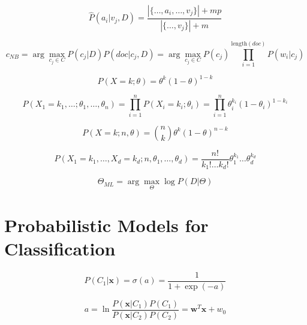 \documentclass{article}
\begin{document}
\begin{equation}
    \hat{P}(a_i | v_j, D) = \frac{|\{ \ldots, a_i, \ldots, v_j \}| + m p}{|\{ \ldots, v_j \}| + m}
\end{equation}

\begin{equation}
    c_{NB} = \arg\max_{c_j \in C} P(c_j | D) P(doc | c_j, D) = \arg\max_{c_j \in C} P(c_j) \prod_{i=1}^{\text{length}(doc)} P(w_i | c_j)
\end{equation}

\begin{equation}
    P(X = k; \theta) = \theta^k (1 - \theta)^{1 - k}
\end{equation}

\begin{equation}
    P(X_1 = k_1, \ldots ; \theta_1, \ldots, \theta_n) = \prod_{i=1}^n P(X_i = k_i; \theta_i) = \prod_{i=1}^n \theta_i^{k_i} (1 - \theta_i)^{1 - k_i}
\end{equation}

\begin{equation}
    P(X = k; n, \theta) = \binom{n}{k} \theta^k (1 - \theta)^{n - k}
\end{equation}

\begin{equation}
    P(X_1 = k_1, \ldots, X_d = k_d; n, \theta_1, \ldots, \theta_d) = \frac{n!}{k_1! \ldots k_d!} \theta_1^{k_1} \ldots \theta_d^{k_d}
\end{equation}

\begin{equation}
    \Theta_{ML} = \arg\max_{\Theta} \log P(D | \Theta)
\end{equation}


\section{Probabilistic Models for Classification}

\begin{equation}
    P(C_1 | \mathbf{x}) = \sigma(a) = \frac{1}{1 + \exp(-a)}
\end{equation}

\begin{equation}
    a = \ln \frac{P(\mathbf{x}|C_1)P(C_1)}{P(\mathbf{x}|C_2)P(C_2)} = \mathbf{w}^T \mathbf{x} + w_0
\end{equation}
\end{document}
